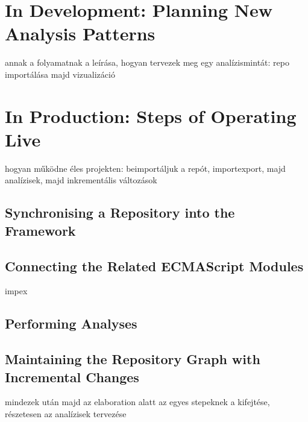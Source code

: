 \section{In Development: Planning New Analysis Patterns}

annak a folyamatnak a leírása, hogyan tervezek meg egy analízismintát: repo importálása majd vizualizáció


\section{In Production: Steps of Operating Live}

hogyan működne éles projekten: beimportáljuk a repót, importexport, majd analízisek, majd inkrementális változások


\subsection{Synchronising a Repository into the Framework}


\subsection{Connecting the Related ECMAScript Modules}

impex


\subsection{Performing Analyses}


\subsection{Maintaining the Repository Graph with Incremental Changes}

mindezek után majd az elaboration alatt az egyes stepeknek a kifejtése, részetesen az analízisek tervezése